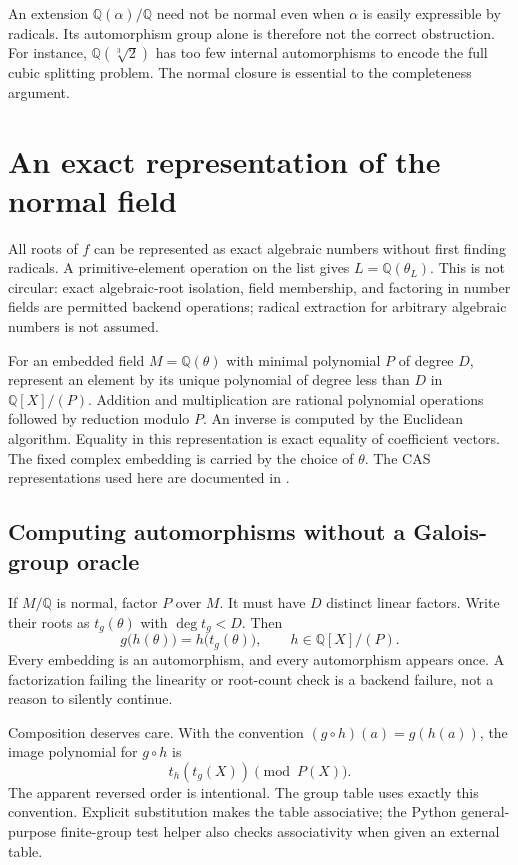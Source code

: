 \documentclass[11pt,a4paper]{article}
\newcommand{\Q}{\mathbb Q}
\theoremstyle{definition}
\begin{document}
An extension $\Q(\alpha)/\Q$ need not be normal even when $\alpha$ is easily
expressible by radicals. Its automorphism group alone is therefore not the
correct obstruction. For instance, $\Q(\sqrt[3]{2})$ has too few internal
automorphisms to encode the full cubic splitting problem. The normal closure
is essential to the completeness argument.

\section{An exact representation of the normal field}
All roots of $f$ can be represented as exact algebraic numbers without first
finding radicals. A primitive-element operation on the list gives
$L=\Q(\theta_L)$. This is not circular: exact algebraic-root isolation, field
membership, and factoring in number fields are permitted backend operations;
radical extraction for arbitrary algebraic numbers is not assumed.

For an embedded field $M=\Q(\theta)$ with minimal polynomial $P$ of degree $D$,
represent an element by its unique polynomial of degree less than $D$ in
$\Q[X]/(P)$. Addition and multiplication are rational polynomial operations
followed by reduction modulo $P$. An inverse is computed by the Euclidean
algorithm. Equality in this representation is exact equality of coefficient
vectors. The fixed complex embedding is carried by the choice of $\theta$. The CAS
representations used here are documented in \cite{wlexact,sympydomains}.

\subsection{Computing automorphisms without a Galois-group oracle}
If $M/\Q$ is normal, factor $P$ over $M$. It must have $D$ distinct linear
factors. Write their roots as $t_g(\theta)$ with $\deg t_g<D$. Then
\begin{equation}\label{eq:action}
 g\bigl(h(\theta)\bigr)=h\bigl(t_g(\theta)\bigr),
 \qquad h\in\Q[X]/(P).
\end{equation}
Every embedding is an automorphism, and every automorphism appears once. A
factorization failing the linearity or root-count check is a backend failure,
not a reason to silently continue.

Composition deserves care. With the convention $(g\circ h)(a)=g(h(a))$, the
image polynomial for $g\circ h$ is
\[
 t_h(t_g(X))\pmod {P(X)}.
\]
The apparent reversed order is intentional. The group table uses exactly this
convention. Explicit substitution makes the table associative; the Python
general-purpose finite-group test helper also checks associativity when given
an external table.
\end{document}
